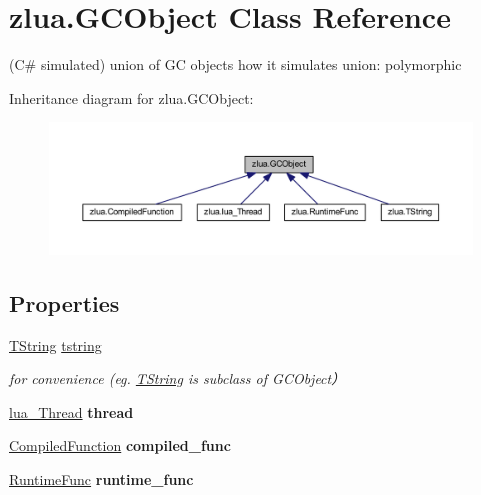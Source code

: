 \hypertarget{classzlua_1_1_g_c_object}{}\section{zlua.\+G\+C\+Object Class Reference}
\label{classzlua_1_1_g_c_object}


(C\# simulated) union of GC objects how it simulates union\+: polymorphic  




Inheritance diagram for zlua.\+G\+C\+Object\+:
\nopagebreak
\begin{figure}[H]
\begin{center}
\leavevmode
\includegraphics[width=350pt]{classzlua_1_1_g_c_object__inherit__graph}
\end{center}
\end{figure}
\subsection*{Properties}
\begin{DoxyCompactItemize}
\item 
\mbox{\hyperlink{classzlua_1_1_t_string}{T\+String}} \mbox{\hyperlink{classzlua_1_1_g_c_object_adcdbddfaf950e2317f916f184d5b9cfb}{tstring}}
\begin{DoxyCompactList}\small\item\em for convenience (eg. \mbox{\hyperlink{classzlua_1_1_t_string}{T\+String}} is subclass of G\+C\+Object） \end{DoxyCompactList}\item 
\mbox{\label{classzlua_1_1_g_c_object_a7146f38e63ed0b5ce02b3df6018593cd}} 
\mbox{\hyperlink{classzlua_1_1lua___thread}{lua\+\_\+\+Thread}} {\bfseries thread}
\item 
\mbox{\label{classzlua_1_1_g_c_object_a0310e8bc45b59801052df6a32dcaa123}} 
\mbox{\hyperlink{classzlua_1_1_compiled_function}{Compiled\+Function}} {\bfseries compiled\+\_\+func}
\item 
\mbox{\label{classzlua_1_1_g_c_object_aaff4acdded9ec0227d9837632498d32c}} 
\mbox{\hyperlink{classzlua_1_1_runtime_func}{Runtime\+Func}} {\bfseries runtime\+\_\+func}
\end{DoxyCompactItemize}


